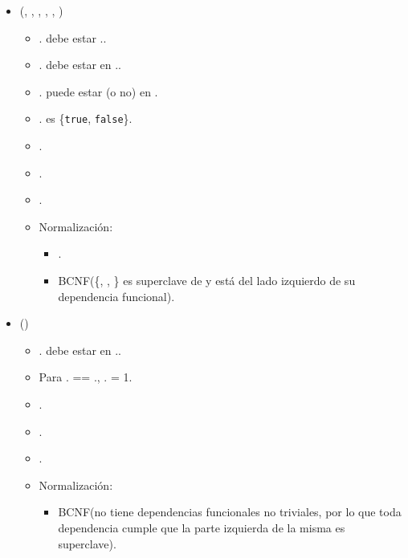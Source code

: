 \begin{itemize}
    \item {}(, ,
          , , , )
          \begin{itemize}
              \item {}. debe estar
                    ..
              \item {}. debe estar en
                    ..
              \item {}. puede estar (o
                    no) en .
              \item {}. es \{\texttt{true},
                    \texttt{false}\}.
              \item {}.
              \item {}.
              \item {}.
              \item Normalización:
                    \begin{itemize}
                        \item {}.
                        \item BCNF(\{, , \} es superclave de
                               y está del lado izquierdo de su dependencia funcional).
                    \end{itemize}
          \end{itemize}

    \item {}()
          \begin{itemize}
              \item {}. debe estar en
                    ..
              \item Para . == .,
                    . = 1.
              \item {}.
              \item {}.
              \item {}.
              \item Normalización:
                    \begin{itemize}
                        \item BCNF(no tiene dependencias funcionales no triviales, por lo que toda
                              dependencia cumple que la parte izquierda de la misma es superclave).
                    \end{itemize}
          \end{itemize}


\end{itemize}
